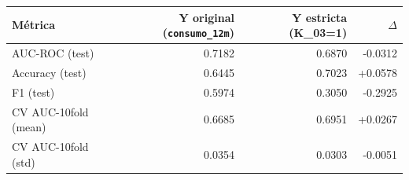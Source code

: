 \begin{tabular}{lrrr}
\toprule
Métrica & Y original (\texttt{consumo\_12m}) & Y estricta (K\_03=1) & $\Delta$ \\
\midrule
AUC-ROC (test) & 0.7182 & 0.6870 & -0.0312 \\
Accuracy (test) & 0.6445 & 0.7023 & +0.0578 \\
F1 (test) & 0.5974 & 0.3050 & -0.2925 \\
CV AUC-10fold (mean) & 0.6685 & 0.6951 & +0.0267 \\
CV AUC-10fold (std) & 0.0354 & 0.0303 & -0.0051 \\
\bottomrule
\end{tabular}